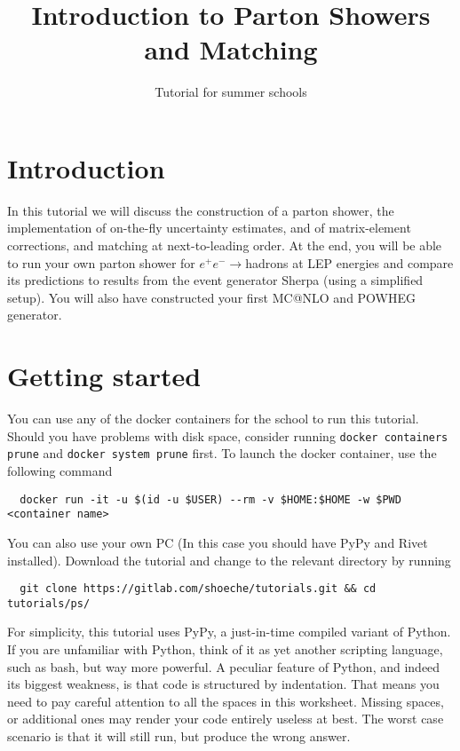 \documentclass[10pt,fleqn]{scrartcl}
\begin{document}
\title{\vspace*{-2em} Introduction to Parton Showers and Matching}
\author{Tutorial for summer schools}
\date{}
\maketitle

\section{Introduction}

In this tutorial we will discuss the construction of a parton shower, 
the implementation of on-the-fly uncertainty estimates, and of
matrix-element corrections, and matching at next-to-leading order.
At the end, you will be able to run your own parton shower for $e^+e^-\to$hadrons
at LEP energies and compare its predictions to results from the event generator 
Sherpa (using a simplified setup). You will also have constructed your first
MC@NLO and POWHEG generator.

\section{Getting started}

You can use any of the docker containers for the school to run this tutorial.
Should you have problems with disk space, consider running
{\tt docker containers prune} and {\tt docker system prune} first.
To launch the docker container, use the following command
\begin{verbatim}
  docker run -it -u $(id -u $USER) --rm -v $HOME:$HOME -w $PWD <container name>
\end{verbatim}
You can also use your own PC (In this case you should have PyPy and Rivet installed).
Download the tutorial and change to the relevant directory by running
\begin{verbatim}
  git clone https://gitlab.com/shoeche/tutorials.git && cd tutorials/ps/
\end{verbatim}
For simplicity, this tutorial uses PyPy, a just-in-time compiled variant of Python.
If you are unfamiliar with Python, think of it as yet another scripting language,
such as bash, but way more powerful. A peculiar feature of Python, and indeed its
biggest weakness, is that code is structured by indentation.
That means you need to pay careful attention to all the spaces in this worksheet.
Missing spaces, or additional ones may render your code entirely useless at best.
The worst case scenario is that it will still run, but produce the wrong answer.
\end{document}
